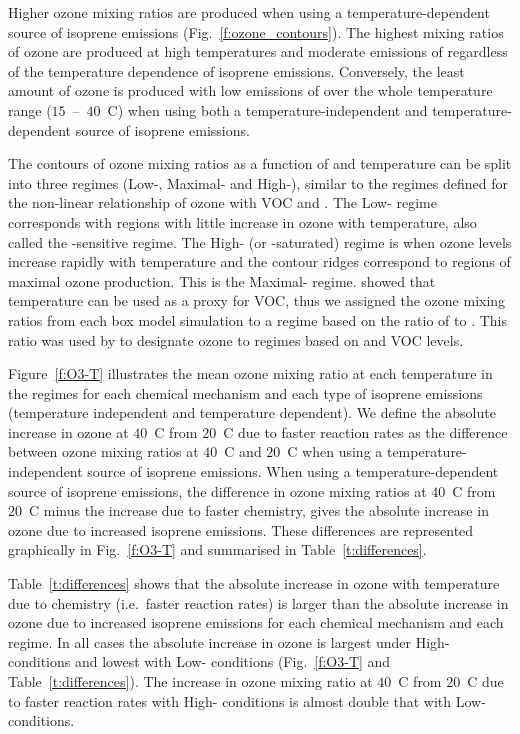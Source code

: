Higher ozone mixing ratios are produced when using a temperature-dependent source of isoprene emissions (Fig.~\ref{f:ozone_contours}).
The highest mixing ratios of ozone are produced at high temperatures and moderate emissions of  regardless of the temperature dependence of isoprene emissions.
Conversely, the least amount of ozone is produced with low emissions of  over the whole temperature range ($15$~--~$40$~\degree C) when using both a temperature-independent and temperature-dependent source of isoprene emissions.

The contours of ozone mixing ratios as a function of  and temperature can be split into three  regimes (Low-, Maximal- and High-), similar to the  regimes defined for the non-linear relationship of ozone with VOC and .
The Low- regime corresponds with regions with little increase in ozone with temperature, also called the -sensitive regime.
The High- (or -saturated) regime is when ozone levels increase rapidly with temperature and the contour ridges correspond to regions of maximal ozone production.
This is the Maximal- regime.
\citet{Pusede:2014} showed that temperature can be used as a proxy for VOC, thus we assigned the ozone mixing ratios from each box model simulation to a  regime based on the ratio of  to .
This ratio was used by \citet{Sillman:1995} to designate ozone to  regimes based on  and VOC levels.

Figure~\ref{f:O3-T} illustrates the mean ozone mixing ratio at each temperature in the  regimes for each chemical mechanism and each type of isoprene emissions (temperature independent and temperature dependent).  
We define the absolute increase in ozone at $40$~\degree C from $20$~\degree C due to faster reaction rates as the difference between ozone mixing ratios at $40$~\degree C and $20$~\degree C when using a temperature-independent source of isoprene emissions.
When using a temperature-dependent source of isoprene emissions, the difference in ozone mixing ratios at $40$~\degree C from $20$~\degree C minus the increase due to faster chemistry, gives the absolute increase in ozone due to increased isoprene emissions.
These differences are represented graphically in Fig.~\ref{f:O3-T} and summarised in Table~\ref{t:differences}.

Table~\ref{t:differences} shows that the absolute increase in ozone with temperature due to chemistry (i.e.~faster reaction rates) is larger than the absolute increase in ozone due to increased isoprene emissions for each chemical mechanism and each  regime.
In all cases the absolute increase in ozone is largest under High- conditions and lowest with Low- conditions (Fig.~\ref{f:O3-T} and Table~\ref{t:differences}).
The increase in ozone mixing ratio at $40$~\degree C from $20$~\degree C due to faster reaction rates with High- conditions is almost double that with Low- conditions.

